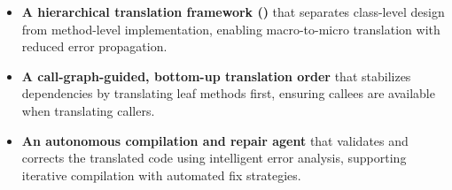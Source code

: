 \begin{itemize}
\item \textbf{A hierarchical translation framework (\tool{})} that separates class-level design from method-level implementation, enabling macro-to-micro translation with reduced error propagation.

\item \textbf{A call-graph-guided, bottom-up translation order} that stabilizes dependencies by translating leaf methods first, ensuring callees are available when translating callers.

\item \textbf{An autonomous compilation and repair agent} that validates and corrects the translated code using intelligent error analysis, supporting iterative compilation with automated fix strategies.

\end{itemize}
